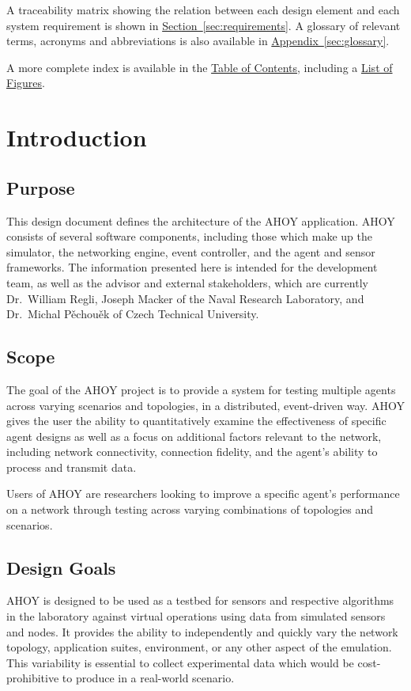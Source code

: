 \documentclass[titlepage]{article}
\newcommand{\rrref}[2]{\hyperref[#2]{#1}}
\newcommand{\sref}[1]{\hyperref[#1]{Section~\ref*{#1}}}
\newcommand{\aref}[1]{\hyperref[#1]{Appendix~\ref*{#1}}}
\begin{document}
A traceability matrix showing the relation between each design element and each system requirement is shown in \sref{sec:requirements}. A glossary of relevant terms, acronyms and abbreviations is also available in \aref{sec:glossary}.

A more complete index is available in the \rrref{Table of Contents}{toc}, including a \rrref{List of Figures}{lof}. 

\section{Introduction}
\label{sec:introduction}
\subsection{Purpose}
\label{sec:purpose}
This design document defines the architecture of the AHOY application. AHOY consists of several software components, including those which make up the simulator, the networking engine, event controller, and the agent and sensor frameworks. The information presented here is intended for the development team, as well as the advisor and external stakeholders, which are currently Dr.~William Regli, Joseph Macker of the Naval Research Laboratory, and Dr.~Michal P\v{e}chou\v{e}k of Czech Technical University. 

\subsection{Scope}
The goal of the AHOY project is to provide a system for testing multiple agents across varying scenarios and topologies, in a distributed, event-driven way. AHOY gives the user the ability to quantitatively examine the effectiveness of specific agent designs as well as a focus on additional factors relevant to the network, including network connectivity, connection fidelity, and the agent's ability to process and transmit data.

Users of AHOY are researchers looking to improve a specific agent's performance on a network through testing across varying combinations of topologies and scenarios.

\subsection{Design Goals}
AHOY is designed to be used as a testbed for sensors and respective algorithms in the laboratory against virtual operations using data from simulated sensors and nodes. It provides the ability to independently and quickly vary the network topology, application suites, environment, or any other aspect of the emulation. This variability is essential to collect experimental data which would be cost-prohibitive to produce in a real-world scenario. 
\end{document}
